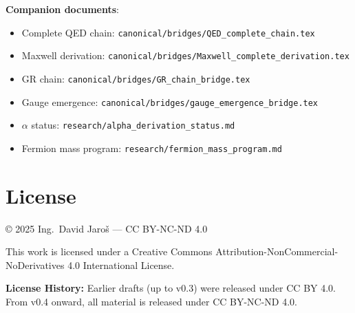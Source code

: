 \documentclass[12pt,a4paper]{article}
\begin{document}
\bigskip
\noindent\textbf{Companion documents}:
\begin{itemize}
  \item Complete QED chain: \texttt{canonical/bridges/QED\_complete\_chain.tex}
  \item Maxwell derivation: \texttt{canonical/bridges/Maxwell\_complete\_derivation.tex}
  \item GR chain: \texttt{canonical/bridges/GR\_chain\_bridge.tex}
  \item Gauge emergence: \texttt{canonical/bridges/gauge\_emergence\_bridge.tex}
  \item $\alpha$ status: \texttt{research/alpha\_derivation\_status.md}
  \item Fermion mass program: \texttt{research/fermion\_mass\_program.md}
\end{itemize}

\section*{License}

\noindent © 2025 Ing.\ David Jaroš — CC BY-NC-ND 4.0

This work is licensed under a Creative Commons
Attribution-NonCommercial-NoDerivatives 4.0 International License.

\textbf{License History:} Earlier drafts (up to v0.3) were released under
CC BY 4.0. From v0.4 onward, all material is released under CC BY-NC-ND 4.0.
\end{document}
